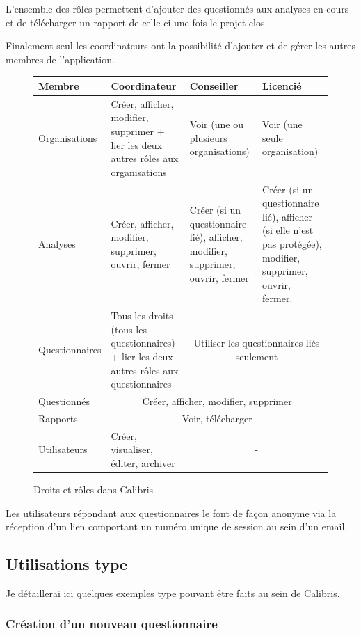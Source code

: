 \documentclass[12pt,a4paper]{book}
\newcommand{\otoprule}{\midrule[\heavyrulewidth]}
\begin{document}
L'ensemble des rôles permettent d'ajouter des questionnés aux analyses en cours et de télécharger un rapport de celle-ci une fois le projet clos.

Finalement seul les coordinateurs ont la possibilité d'ajouter et de gérer les autres membres de l'application.

\begin{figure}[h]
   \centering
        \begin{tabular}{p{3cm}p{4cm}p{4cm}p{4cm}}
            \toprule
            Membre & Coordinateur & Conseiller & Licencié
            \tabularnewline\otoprule
            Organisations & Créer, afficher, modifier, supprimer + lier les deux autres rôles aux organisations & Voir (une ou plusieurs organisations) & Voir (une seule organisation)
            \tabularnewline\midrule
            Analyses & Créer, afficher, modifier, supprimer, ouvrir, fermer & Créer (si un questionnaire lié), afficher, modifier, supprimer, ouvrir, fermer & Créer (si un questionnaire lié), afficher (si elle n'est pas protégée), modifier, supprimer, ouvrir, fermer.
            \tabularnewline\midrule
            Questionnaires & Tous les droits (tous les questionnaires) + lier les deux autres rôles aux questionnaires & \multicolumn{2}{c}{Utiliser les questionnaires liés seulement}
            \tabularnewline\midrule
            Questionnés & \multicolumn{3}{c}{Créer, afficher, modifier, supprimer}
            \tabularnewline\midrule\midrule
            Rapports & \multicolumn{3}{c}{Voir, télécharger}
            \tabularnewline\midrule
            Utilisateurs & Créer, visualiser, éditer, archiver & \multicolumn{2}{c}{-}
            \tabularnewline\bottomrule
        \end{tabular}
\caption{Droits et rôles dans Calibris} 
\label{table.droits_calibris}
\end{figure}
  
Les utilisateurs répondant aux questionnaires le font de façon anonyme via la réception d'un lien comportant un numéro unique de session au sein d'un email.

\subsection{Utilisations type}

Je détaillerai ici quelques exemples type pouvant être faits au sein de Calibris.

\subsubsection{Création d'un nouveau questionnaire}
\end{document}
